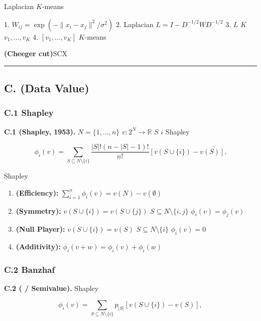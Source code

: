 \documentclass[
  12pt,
]{article}
\providecommand{\tightlist}{%
  \setlength{\itemsep}{0pt}\setlength{\parskip}{0pt}}
\begin{document}
\textbf{}
Laplacian  \(K\)-means

\textbf{} 1. 
\(W_{ij} = \exp(-\|x_i - x_j\|^2 / \sigma^2)\) 2.  Laplacian
\(L = I - D^{-1/2} W D^{-1/2}\) 3.  \(L\)  \(K\) 
\(v_1, \dots, v_K\) 4.  \([v_1, \dots, v_K]\)  \(K\)-means

\textbf{ (Cheeger cut)}SCX
\textbf{}

\begin{center}\rule{0.5\linewidth}{0.5pt}\end{center}

\subsection{C.  (Data
Value)}\label{c.-ux6570ux636eux4ef7ux503c-data-value}

\subsubsection{C.1 Shapley
}\label{c.1-shapley-ux503cux516cux7406ux4f53ux7cfb}

\textbf{ C.1 (Shapley, 1953).}  \(N = \{1, \dots, n\}\)
\(v: 2^N \to \mathbb{R}\)  \(S\)
 \(i\)  Shapley 

\[\phi_i(v) = \sum_{S \subseteq N \setminus \{i\}} \frac{|S|! (n - |S| - 1)!}{n!} [v(S \cup \{i\}) - v(S)].\]

Shapley 

\begin{enumerate}
\def\labelenumi{\arabic{enumi}.}
\tightlist
\item
  \textbf{ (Efficiency):}
  \(\sum_{i=1}^n \phi_i(v) = v(N) - v(\emptyset)\)
\item
  \textbf{ (Symmetry):}  \(v(S \cup \{i\}) = v(S \cup \{j\})\)
   \(S \subseteq N \setminus \{i,j\}\) 
  \(\phi_i(v) = \phi_j(v)\)
\item
  \textbf{ (Null Player):}  \(v(S \cup \{i\}) = v(S)\) 
  \(S \subseteq N \setminus \{i\}\)  \(\phi_i(v) = 0\)
\item
  \textbf{ (Additivity):}
  \(\phi_i(v + w) = \phi_i(v) + \phi_i(w)\)
\end{enumerate}

\subsubsection{C.2  Banzhaf
}\label{c.2-ux534aux503cux548c-banzhaf-ux503c}

\textbf{ C.2 ( / Semivalue).}  Shapley


\[\phi_i(v) = \sum_{S \subseteq N \setminus \{i\}} p_{|S|} [v(S \cup \{i\}) - v(S)],\]
\end{document}

